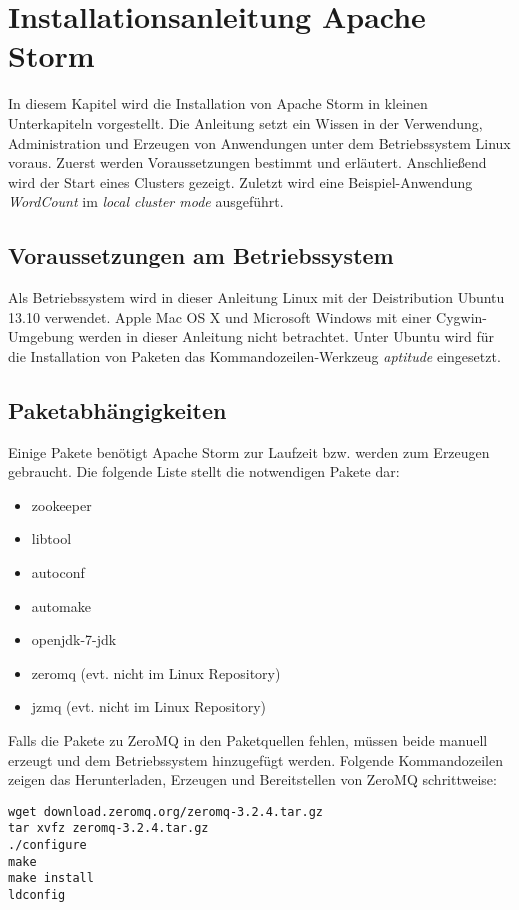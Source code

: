 \section{Installationsanleitung Apache Storm}
\label{sec:storminstall}


In diesem Kapitel wird die Installation von Apache Storm in kleinen Unterkapiteln vorgestellt. Die Anleitung setzt ein Wissen in der Verwendung, Administration und Erzeugen von Anwendungen unter dem Betriebssystem Linux voraus. Zuerst werden Voraussetzungen bestimmt und erläutert. Anschließend wird der Start eines Clusters gezeigt. Zuletzt wird eine Beispiel-Anwendung \textit{WordCount} im \textit{local cluster mode} ausgeführt.


\subsection{Voraussetzungen am Betriebssystem}

Als Betriebssystem wird in dieser Anleitung Linux mit der Deistribution Ubuntu 13.10 verwendet. Apple Mac OS X und Microsoft Windows mit einer Cygwin-Umgebung werden in dieser Anleitung nicht betrachtet. Unter Ubuntu wird für die Installation von Paketen das Kommandozeilen-Werkzeug \textit{aptitude }eingesetzt.


\subsection{Paketabhängigkeiten}

Einige Pakete benötigt Apache Storm zur Laufzeit bzw. werden zum Erzeugen gebraucht. Die folgende Liste stellt die notwendigen Pakete dar:

\begin{itemize}
	\item zookeeper
	\item libtool
	\item autoconf
	\item automake
	\item openjdk-7-jdk
	\item zeromq (evt. nicht im Linux Repository)
	\item jzmq (evt. nicht im Linux Repository)
\end{itemize}

Falls die Pakete zu ZeroMQ in den Paketquellen fehlen, müssen beide manuell erzeugt und dem Betriebssystem hinzugefügt werden. Folgende Kommandozeilen zeigen das Herunterladen, Erzeugen und Bereitstellen von ZeroMQ schrittweise:
\begin{verbatim}
wget download.zeromq.org/zeromq-3.2.4.tar.gz
tar xvfz zeromq-3.2.4.tar.gz
./configure
make 
make install
ldconfig
\end{verbatim}

